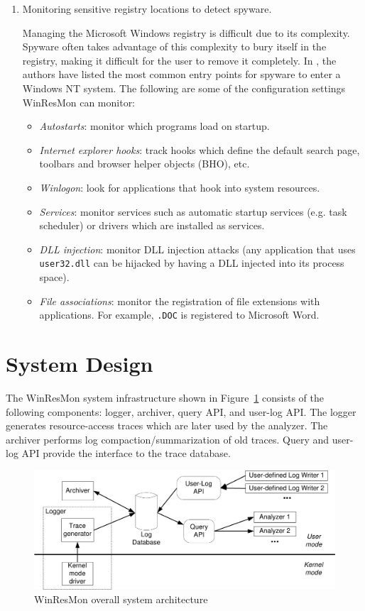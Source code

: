 \begin{enumerate}
\item Monitoring sensitive registry locations to detect spyware.

Managing the Microsoft Windows registry is difficult due to its complexity.
Spyware often takes advantage of this complexity to bury itself in the
registry, making it difficult for the user to remove it completely.  In
\cite{asep}, the authors have listed the most common entry points for spyware
to enter a Windows NT system.  The following are some of the configuration
settings WinResMon can monitor:

\begin{itemize}

\item {\em Autostarts}: monitor which programs load on startup.
\item {\em Internet explorer hooks}: track hooks which define
the default search page, toolbars and browser helper objects (BHO), etc.
\item  {\em Winlogon}: look for applications that hook into system
resources.
\item  {\em Services}: monitor services such as automatic startup services
(e.g. task scheduler) or drivers which are installed as services.
\item {\em DLL injection}: monitor DLL injection attacks (any application
that uses {\small\tt user32.dll} can be hijacked by having a DLL injected into its
process space).
\item {\em File associations}: monitor the registration of file extensions
with applications.  For example, {\small\tt .DOC} is registered to Microsoft Word.

\end{itemize}
\end{enumerate}


\section{System Design}

The WinResMon system infrastructure shown in Figure~\ref{usp} consists of the
following components: logger, archiver, query API, and user-log API.  
The logger generates
resource-access traces which are later used by the analyzer.  The archiver
performs log compaction/summarization of old traces.
Query and user-log API provide the interface to the trace database.

\begin{figure}
\centering
\includegraphics[scale=0.6]{winresmon/usp}
\caption{WinResMon overall system architecture}
\label{usp}
\end{figure}


